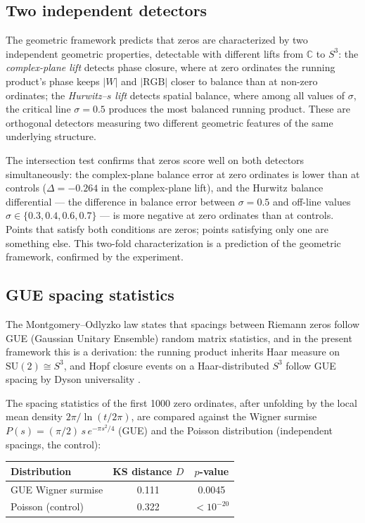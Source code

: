 \documentclass[12pt,a4paper]{article}
\theoremstyle{definition}
\theoremstyle{remark}
\begin{document}
\subsection{Two independent detectors}

The geometric framework predicts that zeros are characterized by two
independent geometric properties, detectable with different lifts from
$\mathbb{C}$ to $S^3$: the \emph{complex-plane lift} detects phase closure,
where at zero ordinates the running product's phase keeps $|W|$ and
$|\mathrm{RGB}|$ closer to balance than at non-zero ordinates; the
\emph{Hurwitz--$s$ lift} detects spatial balance, where among all values of
$\sigma$, the critical line $\sigma = 0.5$ produces the most balanced running
product. These are orthogonal detectors measuring two different geometric
features of the same underlying structure.

The intersection test confirms that zeros score well on both detectors
simultaneously: the complex-plane balance error at zero ordinates is lower
than at controls ($\Delta = -0.264$ in the complex-plane lift), and the
Hurwitz balance differential --- the difference in balance error between
$\sigma = 0.5$ and off-line values $\sigma \in \{0.3, 0.4, 0.6, 0.7\}$ ---
is more negative at zero ordinates than at controls. Points that satisfy both
conditions are zeros; points satisfying only one are something else. This
two-fold characterization is a prediction of the geometric framework, confirmed
by the experiment.

\subsection{GUE spacing statistics}

The Montgomery--Odlyzko law \cite{montgomery1973,odlyzko1987} states that
spacings between Riemann zeros follow GUE (Gaussian Unitary Ensemble) random
matrix statistics, and in the present framework this is a derivation:
the running product inherits Haar measure on
$\mathrm{SU}(2) \cong S^3$, and Hopf closure events on a Haar-distributed
$S^3$ follow GUE spacing by Dyson universality \cite{dyson1962}.

The spacing statistics of the first 1000 zero ordinates, after unfolding by the
local mean density $2\pi / \ln(t/2\pi)$, are compared against the Wigner
surmise $P(s) = (\pi/2)\,s\,e^{-\pi s^2/4}$ (GUE) and the Poisson
distribution (independent spacings, the control):

\begin{center}
\begin{tabular}{lcc}
\toprule
Distribution & KS distance $D$ & $p$-value \\
\midrule
GUE Wigner surmise & 0.111 & 0.0045 \\
Poisson (control) & 0.322 & $< 10^{-20}$ \\
\bottomrule
\end{tabular}
\end{center}
\end{document}
